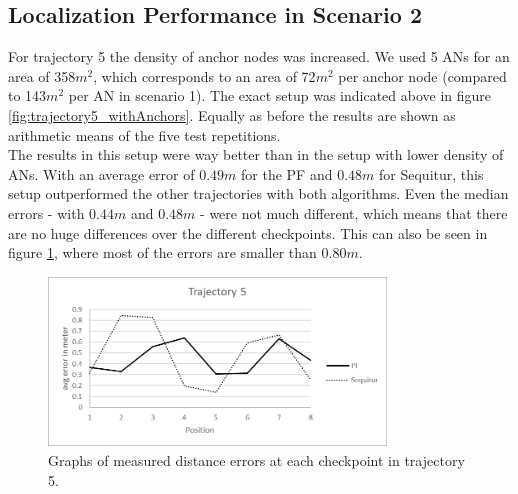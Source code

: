 \subsection{Localization Performance in Scenario 2}
For trajectory 5 the density of anchor nodes was increased. We used 5 ANs for an area of 358$m^2$, which corresponds to an area of 72$m^2$ per anchor node (compared to 143$m^2$ per AN in scenario 1). The exact setup was indicated above in figure \ref{fig:trajectory5_withAnchors}. Equally as before the results are shown as arithmetic means of the five test repetitions.\\
\noindent\hspace*{5mm}%
The results in this setup were way better than in the setup with lower density of ANs. With an average error of $0.49m$ for the PF and $0.48m$ for Sequitur, this setup outperformed the other trajectories with both algorithms. Even the median errors - with $0.44m$ and $0.48m$ -  were not much different, which means that there are no huge differences over the different checkpoints. This can also be seen in figure \ref{fig:trajectory5_results}, where most of the errors are smaller than $0.80m$.

\begin{figure}[th]
\centering
\includegraphics[width=0.8\textwidth]{Figures/trajectory5_results}
\decoRule
\caption[Positioning Results Trajectory 5]{Graphs of measured distance errors at each checkpoint in trajectory 5.}
\label{fig:trajectory5_results}
\end{figure}

